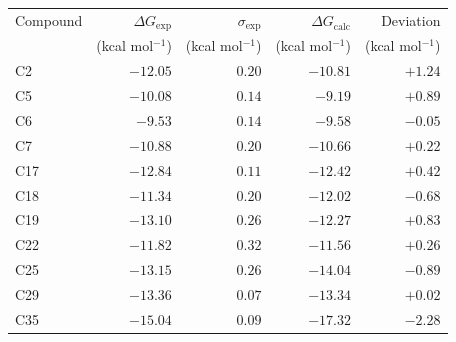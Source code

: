 \begin{table}[htbp]
\centering
\begin{tabular}{lrrrr}
\toprule
Compound & $\Delta G_{\mathrm{exp}}$ & $\sigma_{\mathrm{exp}}$ & $\Delta G_{\mathrm{calc}}$ & Deviation \\
 & (kcal mol$^{-1}$) & (kcal mol$^{-1}$) & (kcal mol$^{-1}$) & (kcal mol$^{-1}$) \\
\midrule
C2 & $-12.05$ & $0.20$ & $-10.81$ & $+1.24$ \\
C5 & $-10.08$ & $0.14$ & $-9.19$ & $+0.89$ \\
C6 & $-9.53$ & $0.14$ & $-9.58$ & $-0.05$ \\
C7 & $-10.88$ & $0.20$ & $-10.66$ & $+0.22$ \\
C17 & $-12.84$ & $0.11$ & $-12.42$ & $+0.42$ \\
C18 & $-11.34$ & $0.20$ & $-12.02$ & $-0.68$ \\
C19 & $-13.10$ & $0.26$ & $-12.27$ & $+0.83$ \\
C22 & $-11.82$ & $0.32$ & $-11.56$ & $+0.26$ \\
C25 & $-13.15$ & $0.26$ & $-14.04$ & $-0.89$ \\
C29 & $-13.36$ & $0.07$ & $-13.34$ & $+0.02$ \\
C35 & $-15.04$ & $0.09$ & $-17.32$ & $-2.28$ \\
\bottomrule
\end{tabular}
\end{table}
